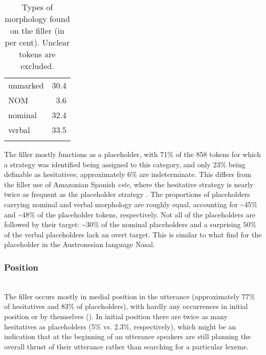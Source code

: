 \documentclass[output=paper]{langscibook}
\begin{document}
\begin{table}
\begin{tabular}{lr}
\lsptoprule
unmarked & 30.4\\
NOM & 3.6\\
nominal & 32.4\\
verbal & 33.5\\
\lspbottomrule
\end{tabular}
\caption{Types of morphology found on the filler (in per cent). Unclear tokens are excluded.}
\label{tab:pakendorf:2b}
\end{table}



The filler mostly functions as a placeholder, with 71\% of the 858 tokens for which a strategy was identified being assigned to this category, and only 23\% being definable as hesitatives; approximately 6\% are indeterminate. This differs from the filler use of Amazonian Spanish \textit{este}, where the hesitative strategy is nearly twice as frequent as the placeholder strategy \citep[665]{Vallejos-Yopán2023}. The proportions of placeholders carrying nominal and verbal morphology are roughly equal, accounting for {\textasciitilde}45\% and {\textasciitilde}48\% of the placeholder tokens, respectively. Not all of the placeholders are followed by their target: {\textasciitilde}30\% of the nominal placeholders and a surprising 50\% of the verbal placeholders lack an overt target. This is similar to what \cite{chapters/billings_mcdonnell} find for the placeholder in the Austronesian language Nasal.

\subsubsection{Position}
\label{sec:pakendorf:4.1.1.2}
~\\
The filler occurs mostly in medial position in the utterance (approximately 77\% of hesitatives and 83\% of placeholders), with hardly any occurrences in initial position or by themselves (). In initial position there are twice as many hesitatives as placeholders (5\% vs. 2.3\%, respectively), which might be an indication that at the beginning of an utterance speakers are still planning the overall thrust of their utterance rather than searching for a particular lexeme. 
\end{document}
